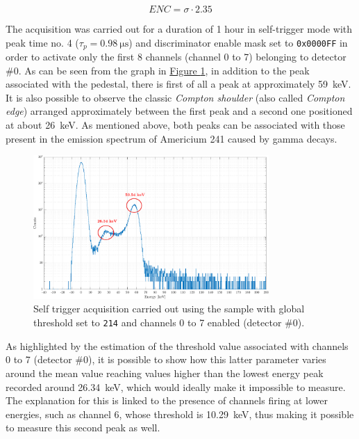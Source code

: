 \vspace{0.15cm}

\begin{equation}
    ENC = \sigma \cdot 2.35
    \label{ENCchargeScan}
\end{equation}

\par
The acquisition was carried out for a duration of 1 hour in self-trigger mode with peak time no. 4 ($\tau_{p} = \SI{0.98}{\micro\second}$) and discriminator enable mask set to \texttt{0x0000FF} in order to activate only the first 8 channels (channel 0 to 7) belonging to detector \#0. As can be seen from the graph in \hyperref[figAmericioTHR214]{Figure \ref{figAmericioTHR214}}, in addition to the peak associated with the pedestal, there is first of all a peak at approximately \SI{59}{\kilo\electronvolt}. It is also possible to observe the classic \textit{Compton shoulder} (also called \textit{Compton edge}) arranged approximately between the first peak and a second one positioned at about \SI{26}{\kilo\electronvolt}. As mentioned above, both peaks can be associated with those present in the emission spectrum of Americium 241 caused by gamma decays.

\begin{figure}[h!]
    \centering
        \includegraphics[width=0.8\textwidth]{Images/chap3/results/americio/ch4_americio_log.pdf}
    \caption{Self trigger acquisition carried out using the  sample with global threshold set to \texttt{214} and channels 0 to 7 enabled (detector \#0).}
    \label{figAmericioTHR214}
\end{figure}

\par
As highlighted by the estimation of the threshold value associated with channels 0 to 7 (detector \#0), it is possible to show how this latter parameter varies around the mean value reaching values higher than the lowest energy peak recorded around \SI{26.34}{\kilo\electronvolt}, which would ideally make it impossible to measure. The explanation for this is linked to the presence of channels firing at lower energies, such as channel 6, whose threshold is \SI{10.29}{\kilo\electronvolt}, thus making it possible to measure this second peak as well.

